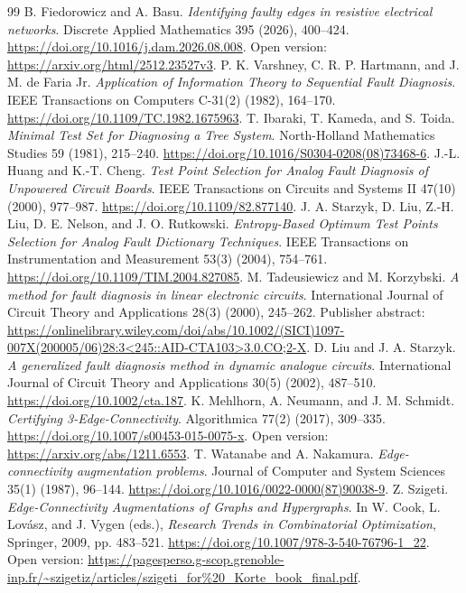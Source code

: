 \documentclass[11pt,letterpaper]{article}
\begin{document}
\begin{thebibliography}{99}
 B. Fiedorowicz and A. Basu. \emph{Identifying faulty edges in resistive electrical networks}. Discrete Applied Mathematics 395 (2026), 400--424. \url{https://doi.org/10.1016/j.dam.2026.08.008}. Open version: \url{https://arxiv.org/html/2512.23527v3}.
 P. K. Varshney, C. R. P. Hartmann, and J. M. de Faria Jr. \emph{Application of Information Theory to Sequential Fault Diagnosis}. IEEE Transactions on Computers C-31(2) (1982), 164--170. \url{https://doi.org/10.1109/TC.1982.1675963}.
 T. Ibaraki, T. Kameda, and S. Toida. \emph{Minimal Test Set for Diagnosing a Tree System}. North-Holland Mathematics Studies 59 (1981), 215--240. \url{https://doi.org/10.1016/S0304-0208(08)73468-6}.
 J.-L. Huang and K.-T. Cheng. \emph{Test Point Selection for Analog Fault Diagnosis of Unpowered Circuit Boards}. IEEE Transactions on Circuits and Systems II 47(10) (2000), 977--987. \url{https://doi.org/10.1109/82.877140}.
 J. A. Starzyk, D. Liu, Z.-H. Liu, D. E. Nelson, and J. O. Rutkowski. \emph{Entropy-Based Optimum Test Points Selection for Analog Fault Dictionary Techniques}. IEEE Transactions on Instrumentation and Measurement 53(3) (2004), 754--761. \url{https://doi.org/10.1109/TIM.2004.827085}.
 M. Tadeusiewicz and M. Korzybski. \emph{A method for fault diagnosis in linear electronic circuits}. International Journal of Circuit Theory and Applications 28(3) (2000), 245--262. Publisher abstract: \url{https://onlinelibrary.wiley.com/doi/abs/10.1002/(SICI)1097-007X(200005/06)28:3<245::AID-CTA103>3.0.CO;2-X}.
 D. Liu and J. A. Starzyk. \emph{A generalized fault diagnosis method in dynamic analogue circuits}. International Journal of Circuit Theory and Applications 30(5) (2002), 487--510. \url{https://doi.org/10.1002/cta.187}.
 K. Mehlhorn, A. Neumann, and J. M. Schmidt. \emph{Certifying 3-Edge-Connectivity}. Algorithmica 77(2) (2017), 309--335. \url{https://doi.org/10.1007/s00453-015-0075-x}. Open version: \url{https://arxiv.org/abs/1211.6553}.
 T. Watanabe and A. Nakamura. \emph{Edge-connectivity augmentation problems}. Journal of Computer and System Sciences 35(1) (1987), 96--144. \url{https://doi.org/10.1016/0022-0000(87)90038-9}.
 Z. Szigeti. \emph{Edge-Connectivity Augmentations of Graphs and Hypergraphs}. In W. Cook, L. Lov\'asz, and J. Vygen (eds.), \emph{Research Trends in Combinatorial Optimization}, Springer, 2009, pp. 483--521. \url{https://doi.org/10.1007/978-3-540-76796-1_22}. Open version: \url{https://pagesperso.g-scop.grenoble-inp.fr/~szigetiz/articles/szigeti_for%20_Korte_book_final.pdf}.

\end{thebibliography}
\end{document}
